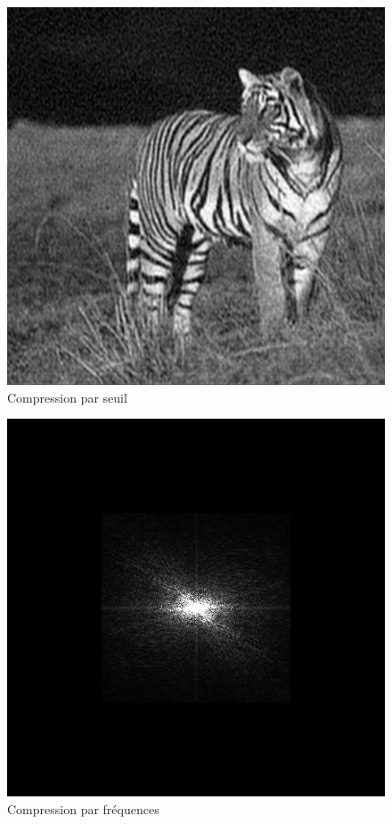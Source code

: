 \documentclass{article}
\begin{document}
\begin{figure}
	\begin{center}
		\includegraphics[scale=0.4]{tigre_compresse_seuil}\\
		Compression par seuil
	\end{center}
\end{figure}
\begin{figure}
	\begin{center}
		\includegraphics[scale=0.4]{lena_compresse}\\
		Compression par fréquences
	\end{center}
\end{figure}
\end{document}

